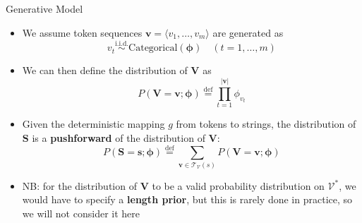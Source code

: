 \documentclass[11pt,compress,t,notes=noshow, xcolor=table]{beamer}
\newcommand{\vocab}{\mathcal{V}}
\newcommand{\probs}{\boldsymbol{\phi}}
\begin{document}
\begin{frame}{Generative Model}

\vfill

\begin{itemize}
\item We assume token sequences $\mathbf{v} = \langle v_1, \dots, v_m\rangle$ are generated as
\begin{equation*}
v_t \overset{\text{i.i.d.}}{\sim} \mathrm{Categorical}(\probs) \quad (t = 1, \dots, m)
\end{equation*}
\item We can then define the distribution of $\mathbf{V}$ as 
\begin{equation*}
P(\mathbf{V} = \mathbf{v}; \probs) \overset{\text{def}}{=} \prod_{t=1}^{|\mathbf{v}|} \phi_{v_t}
\end{equation*}
\item Given the deterministic mapping $g$ from tokens to strings, the distribution of $\mathbf{S}$ is a \textbf{pushforward} of the distribution of $\mathbf{V}$:
\begin{equation*}
P(\mathbf{S} = \mathbf{s}; \probs) \overset{\text{def}}{=} \sum_{\mathbf{v} \in \mathcal{T}_{\vocab}(s)} P(\mathbf{V} = \mathbf{v}; \probs)
\end{equation*}

\item NB: for the distribution of $\mathbf{V}$ to be a valid probability distribution on $\vocab^*$, we would have to specify a \textbf{length prior}, but this is rarely done in practice, so we will not consider it here

\end{itemize}

\vfill


\end{frame}
\end{document}
